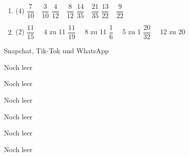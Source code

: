 \documentclass[lerntheke,12pt,a5paper,landscape]{arbeitsblatt}
\begin{document}
	\begin{loesungskarte}
		\begin{enumerate}
			\vspace{1cm}
			\item\begin{tasks}(4)
					\task $\dfrac{7}{10}\quad\dfrac{3}{10}$
					\task $\dfrac{4}{12}\quad\dfrac{8}{12}$
					\task $\dfrac{14}{35}\quad\dfrac{21}{35}$
					\task $\dfrac{13}{22}\quad\dfrac{9}{22}$
				\end{tasks}

			\vspace{1cm}
			\item\begin{tasks}(2)
					\task $\dfrac{11}{15}\quad$ 4 zu 11
					\task $\dfrac{11}{19}\quad$ 8 zu 11
					\task $\dfrac{1}{6}\quad$ 5 zu 1
					\task $\dfrac{20}{32}\quad$ 12 zu 20
				\end{tasks}
		\end{enumerate}
	\end{loesungskarte}

	\begin{karte3}{Snapchat, Tik-Tok und WhatsApp}

	\end{karte3}

	\begin{loesungskarte}

	\end{loesungskarte}

	\begin{karte1}{Noch leer}
	\end{karte1}

	\begin{karte1}{Noch leer}
	\end{karte1}

	\begin{karte1}{Noch leer}
	\end{karte1}

	\begin{karte1}{Noch leer}
	\end{karte1}

	\begin{karte1}{Noch leer}
	\end{karte1}

	\begin{karte1}{Noch leer}
	\end{karte1}
\end{document}
